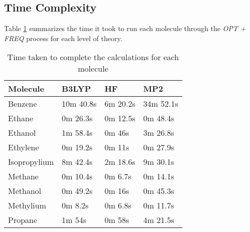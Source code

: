\subsection{Time Complexity}

Table \ref{tab:time} summarizes the time it took to run each molecule through the \emph{OPT + FREQ} process for each level of theory.

\begin{table}[htbp]
\centering
\caption{Time taken to complete the calculations for each molecule}
\label{tab:time}
\begin{tabular}{|l|l|l|l|}
\hline
Molecule     & B3LYP     & HF       & MP2       \\ \hline
Benzene      & 10m 40.8s & 6m 20.2s & 34m 52.1s \\
Ethane       & 0m 26.3s  & 0m 12.5s & 0m 48.4s  \\
Ethanol      & 1m 58.4s  & 0m 46s   & 3m 26.8s  \\
Ethylene     & 0m 19.2s  & 0m 11s   & 0m 27.9s  \\
Isopropylium & 8m 42.4s  & 2m 18.6s & 9m 30.1s  \\
Methane      & 0m 10.4s  & 0m 6.7s  & 0m 14.1s  \\
Methanol     & 0m 49.2s  & 0m 16s   & 0m 45.3s  \\
Methylium    & 0m 8.2s   & 0m 6.8s  & 0m 11.7s  \\
Propane      & 1m 54s    & 0m 58s   & 4m 21.5s  \\ \hline
\end{tabular}
\end{table}